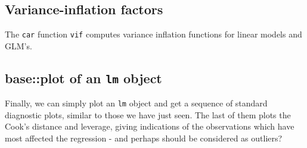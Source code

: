 \documentclass[titlepage]{book}\usepackage{knitr}
\begin{document}
\subsection{Variance-inflation factors}

 The \texttt{car} function \texttt{vif} computes variance inflation functions for linear models and GLM's.
\begin{knitrout}
\color{fgcolor}\begin{kframe}
\begin{alltt}
\end{alltt}
\end{kframe}
\end{knitrout}

\begin{knitrout}
\color{fgcolor}\begin{kframe}
\begin{alltt}
\hlopt{::} \hlstd{=}\hlstd{,} \hlstd{=}\hlstd{,} \hlstd{=}\hlstd{)}
\end{alltt}
\end{kframe}
\end{knitrout}

\subsection{base::plot of an \texttt{lm} object}

Finally, we can simply plot an \texttt{lm} object and get a sequence of standard diagnostic plots, similar to those we have just seen.
The last of them plots the Cook's distance and leverage, giving indications of the observations which have most affected the regression - and perhaps should be considered as outliers?

\begin{knitrout}
\color{fgcolor}\begin{kframe}
\begin{alltt}
\end{alltt}
\end{kframe}
\end{knitrout}




\end{document}
